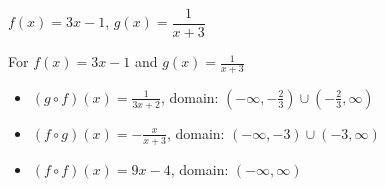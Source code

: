 {$f(x) = 3x-1$, $g(x) = \dfrac{1}{x+3}$}
{For   $f(x) = 3x-1$ and $g(x) = \frac{1}{x+3}$

\begin{itemize}

\item  $(g \circ f)(x) = \frac{1}{3x+2}$, domain: $\left(-\infty, -\frac{2}{3}\right) \cup \left(-\frac{2}{3}, \infty\right)$

\item  $(f \circ g)(x) = -\frac{x}{x+3}$, domain: $\left(-\infty, -3\right) \cup \left(-3, \infty\right)$

\item  $(f \circ f)(x) = 9x-4$, domain: $(-\infty, \infty)$

\end{itemize}}